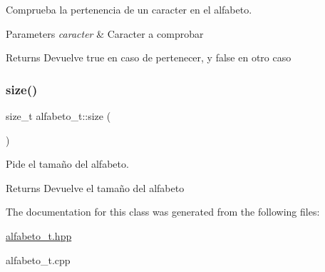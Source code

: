Comprueba la pertenencia de un caracter en el alfabeto. 


\begin{DoxyParams}{Parameters}
{\em caracter} & Caracter a comprobar \\
\hline
\end{DoxyParams}
\begin{DoxyReturn}{Returns}
Devuelve true en caso de pertenecer, y false en otro caso 
\end{DoxyReturn}
\mbox{\label{classalfabeto__t_a9eb89f75097160392ea8bbbdb9783e6b}} 
\subsubsection{\texorpdfstring{size()}{size()}}
{\footnotesize\ttfamily size\+\_\+t alfabeto\+\_\+t\+::size (\begin{DoxyParamCaption}{ }\end{DoxyParamCaption})\hspace{0.3cm}{\ttfamily [inline]}}



Pide el tamaño del alfabeto. 

\begin{DoxyReturn}{Returns}
Devuelve el tamaño del alfabeto 
\end{DoxyReturn}


The documentation for this class was generated from the following files\+:\begin{DoxyCompactItemize}
\item 
\hyperlink{alfabeto__t_8hpp}{alfabeto\+\_\+t.\+hpp}\item 
alfabeto\+\_\+t.\+cpp\end{DoxyCompactItemize}
